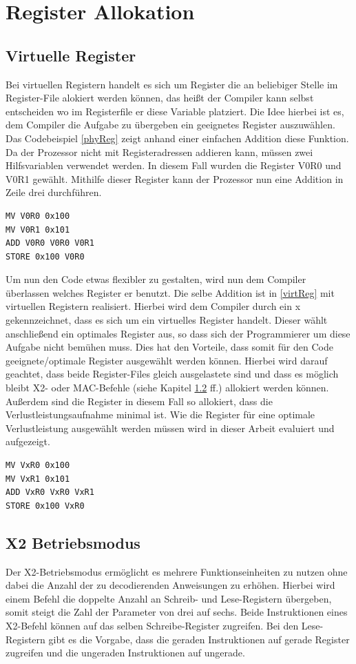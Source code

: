 \section{Register Allokation}
\label{sec:register allok}
\subsection{Virtuelle Register}
Bei virtuellen Registern handelt es sich um Register die an beliebiger Stelle im Register-File alokiert werden können, das heißt der Compiler kann selbst entscheiden wo im Registerfile er diese Variable platziert. 
Die Idee hierbei ist es, dem Compiler die Aufgabe zu übergeben ein geeignetes Register auszuwählen. Das Codebeispiel \ref{phyReg} zeigt anhand einer einfachen Addition diese Funktion. Da der Prozessor nicht mit Registeradressen addieren kann, müssen zwei Hilfsvariablen verwendet werden. In diesem Fall wurden die Register V0R0 und V0R1 gewählt. Mithilfe dieser Register kann der Prozessor nun eine Addition in Zeile drei durchführen.
\renewcommand{\lstlistingname}{Codebeispiel}
\begin{lstlisting}[frame=single, caption={physikalische Register},captionpos=b,label=phyReg]
MV V0R0 0x100
MV V0R1 0x101
ADD V0R0 V0R0 V0R1
STORE 0x100 V0R0
\end{lstlisting}
Um nun den Code etwas flexibler zu gestalten, wird  nun dem Compiler überlassen welches Register er benutzt. Die selbe Addition ist in \ref{virtReg} mit virtuellen Registern realisiert. Hierbei wird dem Compiler durch ein  x gekennzeichnet, dass es sich um ein virtuelles Register handelt. Dieser wählt anschließend ein optimales Register aus, so dass sich der Programmierer um diese Aufgabe nicht bemühen muss. Dies hat den Vorteile, dass somit für den Code geeignete/optimale Register ausgewählt werden können. Hierbei wird darauf geachtet, dass beide Register-Files gleich ausgelastete sind und dass es möglich bleibt X2- oder MAC-Befehle (siehe Kapitel \ref{subsec:x2Mode} ff.) allokiert werden können. Außerdem sind die Register in diesem Fall so allokiert, dass die Verlustleistungsaufnahme minimal ist. Wie die Register für eine optimale Verlustleistung ausgewählt werden müssen wird in dieser Arbeit evaluiert und aufgezeigt.

\begin{lstlisting}[frame=single,caption={virtuelle Register},captionpos=b,label=virtReg]
MV VxR0 0x100
MV VxR1 0x101
ADD VxR0 VxR0 VxR1
STORE 0x100 VxR0
\end{lstlisting}
\subsection{X2 Betriebsmodus}\label{subsec:x2Mode}
Der X2-Betriebsmodus ermöglicht es mehrere Funktionseinheiten zu nutzen ohne dabei die Anzahl der zu decodierenden Anweisungen zu erhöhen. Hierbei wird einem Befehl die doppelte Anzahl an Schreib- und Lese-Registern übergeben, somit steigt die Zahl der Parameter von drei auf sechs. Beide Instruktionen eines X2-Befehl können auf das selben Schreibe-Register zugreifen. Bei den Lese-Registern gibt es die Vorgabe, dass die geraden Instruktionen auf gerade Register zugreifen und die ungeraden Instruktionen auf ungerade.%
